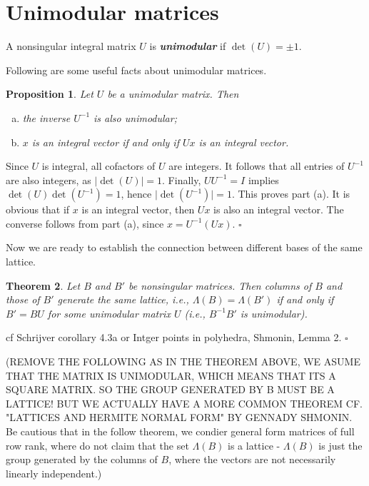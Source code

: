 \documentclass{article}
\newcounter{lecnum}
\newtheorem{theorem}{Theorem}[lecnum]
\newtheorem{proposition}[theorem]{Proposition}
\newenvironment{proof}{{\it Proof.}}{ \hfill $\square$}
\begin{document}
\section{Unimodular matrices}
A nonsingular integral matrix $U$ is \emph{\textbf{unimodular}} if $\det(U)=\pm 1$.

Following are some useful facts about unimodular matrices.
\begin{proposition}
Let $U$ be a unimodular matrix. Then
\begin{enumerate}[(a)]
\item the inverse $U^{-1}$ is also unimodular;
\item $x$ is an integral vector if and only if $Ux$ is an integral vector.
\end{enumerate}
\end{proposition}
\begin{proof}
Since $U$ is integral, all cofactors of $U$ are integers. It follows that all entries of $U^{-1}$ are also integers, as $\lvert \det(U)\rvert=1$. Finally, $UU^{-1}=I$ implies $\det(U)\det(U^{-1})=1$, hence $\lvert \det(U^{-1})\rvert=1$. This proves part (a). It is obvious that if $x$ is an integral vector, then $Ux$ is also an integral vector. The converse follows from part (a), since $x=U^{-1}(Ux)$.
\end{proof}

Now we are ready to establish the connection between different bases of the same lattice. 

\begin{theorem}
Let $B$ and $B'$ be nonsingular matrices. Then columns of $B$ and those of $B'$ generate the same lattice, i.e., $\Lambda(B)=\Lambda(B')$ if and only if $B'=BU$ for some unimodular matrix $U$ (i.e., $B^{-1}B'$ is unimodular).
\end{theorem}
\begin{proof}
cf Schrijver corollary 4.3a or Intger points in polyhedra, Shmonin, Lemma 2.
\end{proof}

(REMOVE THE FOLLOWING AS IN THE THEOREM ABOVE, WE ASUME THAT THE MATRIX IS UNIMODULAR, WHICH MEANS THAT ITS A SQUARE MATRIX. SO THE GROUP GENERATED BY B MUST BE A LATTICE!  BUT WE ACTUALLY HAVE A MORE COMMON THEOREM CF. "LATTICES AND HERMITE NORMAL FORM" BY GENNADY SHMONIN. Be cautious that in the follow theorem, we condier general form matrices of full row rank, where do not claim that the set $\Lambda(B)$ is a lattice - $\Lambda(B)$ is just the group generated by the columns of $B$, where the vectors are not necessarily linearly independent.)
\end{document}
